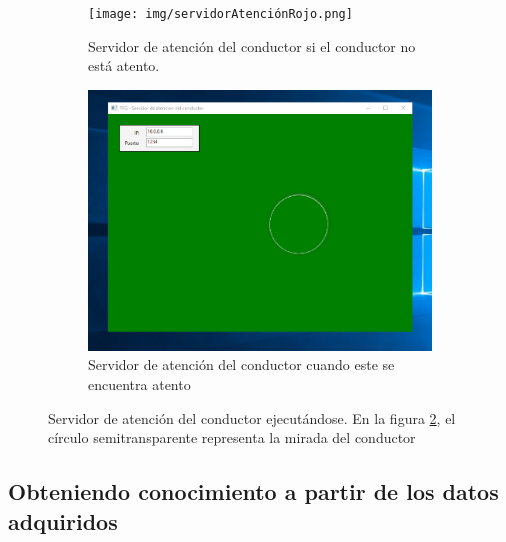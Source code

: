 \begin{figure}
    \begin{subfigure}[c]{.5\textwidth}
      \centering
      \texttt{[image: img/servidorAtenciónRojo.png]}
      \caption{Servidor de atención del conductor si el conductor no está atento.}
      \label{fig:atencionCondRojo}
    \end{subfigure}%
    \begin{subfigure}[c]{.5\textwidth}
      \centering
      \includegraphics[width=.95\linewidth]{img/servidorAtencionVerde.png}
      \caption{Servidor de atención del conductor cuando este se encuentra atento}
      \label{fig:atencionCondVerde}
    \end{subfigure}
    
    \caption[Servidor de atención del conductor ejecutándose.]{Servidor de atención del conductor ejecutándose. En la figura \ref{fig:atencionCondVerde}, el círculo semitransparente representa la mirada del conductor}
    \label{fig:comparativaDephmapRGB}
\end{figure}


\clearpage
\subsection{Obteniendo conocimiento a partir de los datos adquiridos}

